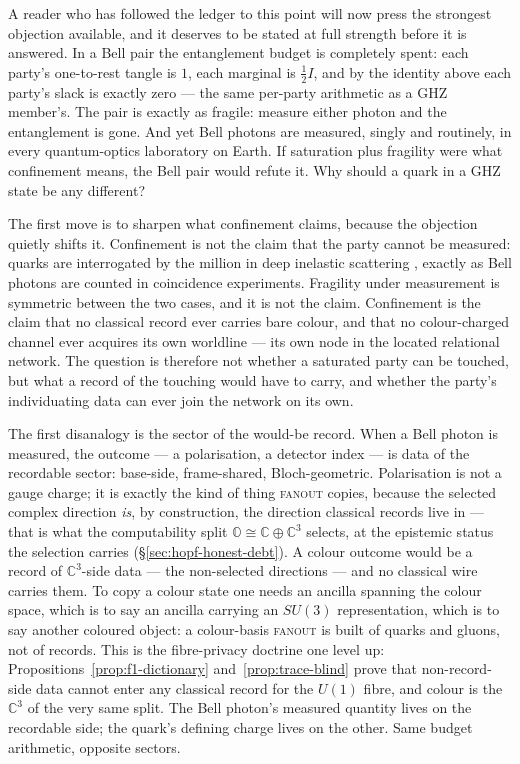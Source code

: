 A reader who has followed the ledger to this point will now press the strongest objection
available, and it deserves to be stated at full strength before it is answered. In a Bell pair the
entanglement budget is completely spent: each party's one-to-rest tangle is $1$, each marginal is
$\tfrac12 I$, and by the identity above each party's slack is exactly zero --- the same per-party
arithmetic as a GHZ member's. The pair is exactly as fragile: measure either photon and the
entanglement is gone. And yet Bell photons are measured, singly and routinely, in every
quantum-optics laboratory on Earth. If saturation plus fragility were what confinement means, the
Bell pair would refute it. Why should a quark in a GHZ state be any different?

The first move is to sharpen what confinement claims, because the objection quietly shifts it.
Confinement is not the claim that the party cannot be measured: quarks are interrogated by the
million in deep inelastic scattering \autocite{breidenbach1969observed}, exactly as Bell photons
are counted in coincidence experiments. Fragility under measurement is symmetric between the two
cases, and it is not the claim. Confinement is the claim that no classical record ever carries bare
colour, and that no colour-charged channel ever acquires its own worldline --- its own node in the
located relational network. The question is therefore not whether a saturated party can be touched,
but what a record of the touching would have to carry, and whether the party's individuating data
can ever join the network on its own.

The first disanalogy is the sector of the would-be record. When a Bell photon is measured, the
outcome --- a polarisation, a detector index --- is data of the recordable sector: base-side,
frame-shared, Bloch-geometric. Polarisation is not a gauge charge; it is exactly the kind of thing
\textsc{fanout} copies, because the selected complex direction \emph{is}, by construction, the
direction classical records live in --- that is what the computability split
$\mathbb{O} \cong \mathbb{C} \oplus \mathbb{C}^{3}$ selects, at the epistemic status the
selection carries (\S\ref{sec:hopf-honest-debt}). A colour outcome would be a record of
$\mathbb{C}^{3}$-side data --- the non-selected directions --- and no classical wire carries them.
To copy a colour state one needs an ancilla spanning the colour space, which is to say an ancilla
carrying an $SU(3)$ representation, which is to say another coloured object: a colour-basis
\textsc{fanout} is built of quarks and gluons, not of records. This is the fibre-privacy doctrine
one level up: Propositions~\ref{prop:f1-dictionary} and~\ref{prop:trace-blind} prove that
non-record-side data cannot enter any classical record for the $U(1)$ fibre, and colour is the
$\mathbb{C}^{3}$ of the very same split. The Bell photon's measured quantity lives on the
recordable side; the quark's defining charge lives on the other. Same budget arithmetic, opposite
sectors.

